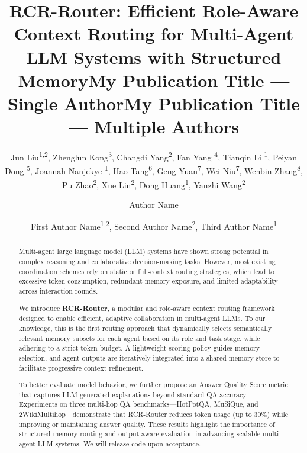 \documentclass[letterpaper]{article} %
\title{RCR-Router: Efficient Role-Aware Context Routing for Multi-Agent LLM Systems with Structured Memory}
\author{
    Jun Liu\textsuperscript{\rm 1,2}, %
    Zhenglun Kong\textsuperscript{\rm 3},
    Changdi Yang\textsuperscript{\rm 2},
    Fan Yang \textsuperscript{\rm 4},
    Tianqin Li \textsuperscript{\rm 1},
    Peiyan Dong \textsuperscript{\rm 5},
    Joannah Nanjekye  \textsuperscript{\rm 1},
    Hao Tang\textsuperscript{\rm 6}, %
    Geng Yuan\textsuperscript{\rm 7}, 
    Wei Niu\textsuperscript{\rm 7},
    Wenbin Zhang\textsuperscript{\rm 8},
    Pu Zhao\textsuperscript{\rm 2},
    Xue Lin\textsuperscript{\rm 2},
    Dong Huang\textsuperscript{\rm 1},%
    Yanzhi Wang\textsuperscript{\rm 2} %
}
\title{My Publication Title --- Single Author}
\author {
    Author Name
}
\title{My Publication Title --- Multiple Authors}
\author {
    First Author Name\textsuperscript{\rm 1,\rm 2},
    Second Author Name\textsuperscript{\rm 2},
    Third Author Name\textsuperscript{\rm 1}
}
\begin{document}
\maketitle

\renewcommand{\thefootnote}{\fnsymbol{footnote}}


\begin{abstract}

Multi-agent large language model (LLM) systems have shown strong potential in complex reasoning and collaborative decision-making tasks. However, most existing coordination schemes rely on static or full-context routing strategies, which lead to excessive token consumption, redundant memory exposure, and limited adaptability across interaction rounds.

We introduce \textbf{RCR-Router}, a modular and role-aware context routing framework designed to enable efficient, adaptive collaboration in multi-agent LLMs. To our knowledge, this is the first routing approach that dynamically selects semantically relevant memory subsets for each agent based on its role and task stage, while adhering to a strict token budget. A lightweight scoring policy guides memory selection, and agent outputs are iteratively integrated into a shared memory store to facilitate progressive context refinement.

To better evaluate model behavior, we further propose an {Answer Quality Score} metric that captures LLM-generated explanations beyond standard QA accuracy. Experiments on three multi-hop QA benchmarks—HotPotQA, MuSiQue, and 2WikiMultihop—demonstrate that RCR-Router reduces token usage (up to 30\%) while improving or maintaining answer quality. These results highlight the importance of structured memory routing and output-aware evaluation in advancing scalable multi-agent LLM systems. We will release code upon acceptance.

\end{abstract}







%
\end{document}
